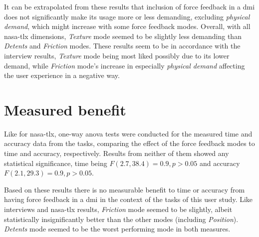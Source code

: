It can be extrapolated from these results that inclusion of force feedback in a \gls{dmi} does not significantly make its usage more or less demanding, excluding \textit{physical demand}, which might increase with some force feedback modes. Overall, with all \gls{nasa-tlx} dimensions, \textit{Texture} mode seemed to be slightly less demanding than \textit{Detents} and \textit{Friction} modes. These results seem to be in accordance with the interview results, \textit{Texture} mode being most liked possibly due to its lower demand, while \textit{Friction} mode's increase in especially \textit{physical demand} affecting the user experience in a negative way.

\section{Measured benefit}

Like for \gls{nasa-tlx}, one-way \gls{anova} tests were conducted for the measured time and accuracy data from the tasks, comparing the effect of the force feedback modes to time and accuracy, respectively. Results from neither of them showed any statistical significance, time being $F(2.7, 38.4) = 0.9, p > 0.05$ and accuracy $F(2.1, 29.3) = 0.9, p > 0.05$.

Based on these results there is no measurable benefit to time or accuracy from having force feedback in a \gls{dmi} in the context of the tasks of this user study. Like interviews and \gls{nasa-tlx} results, \textit{Friction} mode seemed to be slightly, albeit statistically insignificantly better than the other modes (including \textit{Position}). \textit{Detents} mode seemed to be the worst performing mode in both measures.